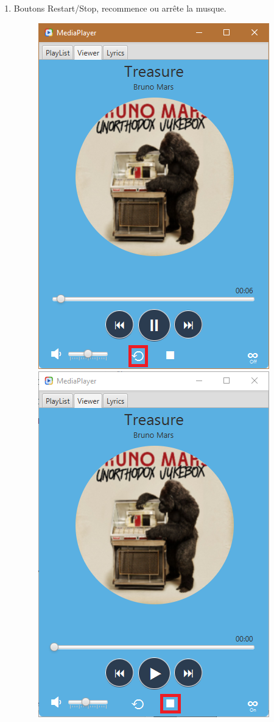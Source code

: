 \documentclass[a4paper,12pt]{report} %
\begin{document}
\begin{enumerate}
		\item Boutons Restart/Stop, recommence ou arrête la musque.
   			\begin{figure}[ht] 		
				\centering
  				\includegraphics[scale=0.6]{restart}
  				\hspace{5mm}
  				\includegraphics[scale=0.6]{stop}
			\end{figure} 
		

\end{enumerate}
\end{document}
